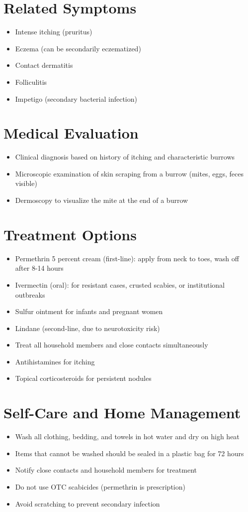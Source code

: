 \section*{Related Symptoms}
\begin{itemize}
\item Intense itching (pruritus)
\item Eczema (can be secondarily eczematized)
\item Contact dermatitis
\item Folliculitis
\item Impetigo (secondary bacterial infection)
\end{itemize}

\section*{Medical Evaluation}
\begin{itemize}
\item Clinical diagnosis based on history of itching and characteristic burrows
\item Microscopic examination of skin scraping from a burrow (mites, eggs, feces visible)
\item Dermoscopy to visualize the mite at the end of a burrow
\end{itemize}

\section*{Treatment Options}
\begin{itemize}
\item Permethrin 5 percent cream (first-line): apply from neck to toes, wash off after 8-14 hours
\item Ivermectin (oral): for resistant cases, crusted scabies, or institutional outbreaks
\item Sulfur ointment for infants and pregnant women
\item Lindane (second-line, due to neurotoxicity risk)
\item Treat all household members and close contacts simultaneously
\item Antihistamines for itching
\item Topical corticosteroids for persistent nodules
\end{itemize}

\section*{Self-Care and Home Management}
\begin{itemize}
\item Wash all clothing, bedding, and towels in hot water and dry on high heat
\item Items that cannot be washed should be sealed in a plastic bag for 72 hours
\item Notify close contacts and household members for treatment
\item Do not use OTC scabicides (permethrin is prescription)
\item Avoid scratching to prevent secondary infection
\end{itemize}

